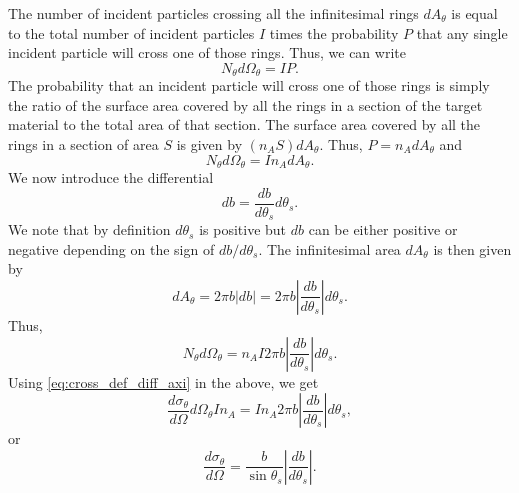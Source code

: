 \documentclass[a4paper,11pt]{report}
\begin{document}
The number of incident particles crossing all the infinitesimal rings $dA_\theta$ is equal to the total number of incident particles $I$ times the probability $P$ that any single incident particle will cross one of those rings. Thus, we can write
\begin{equation*}
    N_\theta d\Omega_\theta = I P.
\end{equation*}
The probability that an incident particle will cross one of those rings is simply the ratio of the surface area covered by all the rings in a section of the target material to the total area of that section. The surface area covered by all the rings in a section of area $S$ is given by $(n_A S) dA_\theta$. Thus, $P = n_A dA_\theta$ and 
\begin{equation*}
    N_\theta d\Omega_\theta = I n_A dA_\theta.
\end{equation*}
We now introduce the differential 
\begin{equation}
    \label{eq:cross_impact_differential}
    db = \frac{db}{d\theta_s} d\theta_s.
\end{equation}
We note that by definition $d\theta_s$ is positive but $db$ can be either positive or negative depending on the sign of $db/d\theta_s$. The infinitesimal area $dA_\theta$ is then given by 
\begin{equation}
    \label{eq:cross_impact_area}
    dA_\theta= 2\pi b |db| = 2 \pi b \left | \frac{db}{d\theta_s} \right | d \theta_s.
\end{equation}
Thus, 
\begin{equation*}
    N_\theta d\Omega_\theta = n_A I 2 \pi b \left | \frac{db}{d\theta_s} \right | d \theta_s.
\end{equation*}
Using \cref{eq:cross_def_diff_axi} in the above, we get
\begin{equation*}
    \frac{d\sigma_\theta}{d\Omega} d\Omega_\theta I n_A = I n_A 2 \pi b \left | \frac{db}{d\theta_s} \right | d \theta_s, 
\end{equation*}
or 
\begin{equation}
    \label{eq:cross_diff_impact_axi}
    \frac{d\sigma_\theta}{d\Omega} = \frac{b}{\sin \theta_s} \left | \frac{db}{d\theta_s} \right |.
\end{equation}

\end{document}
